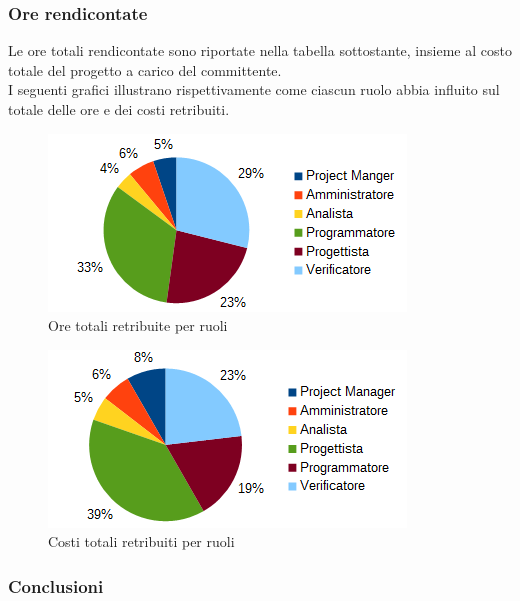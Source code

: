 		\subsubsection{Ore rendicontate}
		Le ore totali rendicontate sono riportate nella tabella sottostante, insieme al costo totale del progetto a carico del committente. \\
		I seguenti grafici illustrano rispettivamente come ciascun ruolo abbia influito sul totale delle ore e dei costi retribuiti.
		\begin{figure}[htbp]
		\centering
			\includegraphics[scale=1]{immagini/grafici/orario_rendicontato-torta.png}
			\caption{Ore totali retribuite per ruoli}
		\end{figure}
		\begin{figure}[htbp]
			\centering
			\includegraphics[scale=1]{immagini/grafici/orario_rendicontato-torta-costo.png}
			\caption{Costi totali retribuiti per ruoli}
		\end{figure}
		\subsubsection{Conclusioni}